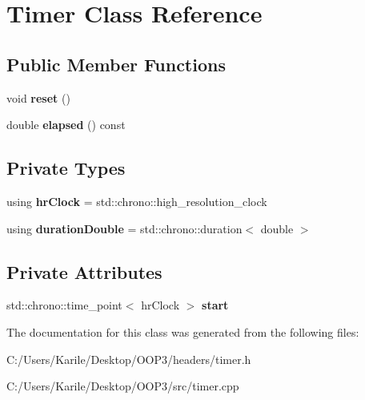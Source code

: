 \hypertarget{class_timer}{}\section{Timer Class Reference}
\label{class_timer}
\subsection*{Public Member Functions}
\begin{DoxyCompactItemize}
\item 
\mbox{\label{class_timer_a9020542d73357a4eef512eefaf57524b}} 
void {\bfseries reset} ()
\item 
\mbox{\label{class_timer_a6a89a613c2af9b0d1e5f7e4ba9e46c54}} 
double {\bfseries elapsed} () const
\end{DoxyCompactItemize}
\subsection*{Private Types}
\begin{DoxyCompactItemize}
\item 
\mbox{\label{class_timer_a5e72191005a6b2238ed91c3839374093}} 
using {\bfseries hr\+Clock} = std\+::chrono\+::high\+\_\+resolution\+\_\+clock
\item 
\mbox{\label{class_timer_a0774383e69e89a22ea605e6841d1eaca}} 
using {\bfseries duration\+Double} = std\+::chrono\+::duration$<$ double $>$
\end{DoxyCompactItemize}
\subsection*{Private Attributes}
\begin{DoxyCompactItemize}
\item 
\mbox{\label{class_timer_ad3c6240154d9bcccb88b701849919822}} 
std\+::chrono\+::time\+\_\+point$<$ hr\+Clock $>$ {\bfseries start}
\end{DoxyCompactItemize}


The documentation for this class was generated from the following files\+:\begin{DoxyCompactItemize}
\item 
C\+:/\+Users/\+Karile/\+Desktop/\+O\+O\+P3/headers/timer.\+h\item 
C\+:/\+Users/\+Karile/\+Desktop/\+O\+O\+P3/src/timer.\+cpp\end{DoxyCompactItemize}
